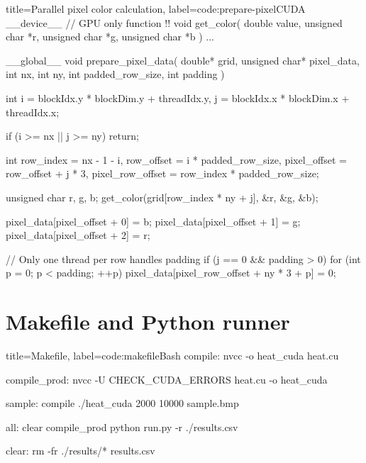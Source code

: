 \documentclass[../main.tex]{subfiles}
\begin{document}
\begin{code}{title=Parallel pixel color calculation, label=code:prepare-pixel}{CUDA}
__device__ // GPU only function !! 
void get_color(
    double value, 
    unsigned char *r, 
    unsigned char *g, 
    unsigned char *b
)
{
...
}

__global__ 
void prepare_pixel_data(
    double* grid,
    unsigned char* pixel_data,
    int nx,
    int ny,
    int padded_row_size,
    int padding
) 
{
    int i = blockIdx.y * blockDim.y + threadIdx.y,
        j = blockIdx.x * blockDim.x + threadIdx.x;

    if (i >= nx || j >= ny) return;

    int row_index           = nx - 1 - i,
        row_offset          = i * padded_row_size,
        pixel_offset        = row_offset + j * 3,
        pixel_row_offset    = row_index * padded_row_size;


    unsigned char r, g, b;
    get_color(grid[row_index * ny + j], &r, &g, &b);

    pixel_data[pixel_offset + 0] = b;
    pixel_data[pixel_offset + 1] = g;
    pixel_data[pixel_offset + 2] = r;

    // Only one thread per row handles padding
    if (j == 0 && padding > 0) {
        for (int p = 0; p < padding; ++p) {
            pixel_data[pixel_row_offset + ny * 3 + p] = 0;
        }
    }
}
\end{code}

\section{Makefile and Python runner}

\begin{code}{title=Makefile, label=code:makefile}{Bash}
compile:
	nvcc -o heat_cuda heat.cu
	
compile_prod:
	nvcc -U CHECK_CUDA_ERRORS heat.cu -o heat_cuda

sample: compile
	./heat_cuda 2000 10000 sample.bmp

all: clear compile_prod
	python run.py -r ./results.csv

clear:
	rm -fr ./results/* results.csv
\end{code}
\end{document}
